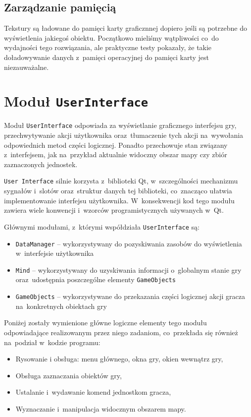 \documentclass[licencjacka]{pracamgr}
\begin{document}
    \subsection{Zarządzanie pamięcią}
      Tekstury są ładowane do pamięci karty graficznnej dopiero jeśli są potrzebne do wyświetlenia jakiegoś
      obiektu. Początkowo mieliśmy wątpliwości co~do wydajności tego rozwiązania, ale praktyczne testy pokazały, że
      takie doładowywanie danych z~pamięci operacyjnej do pamięci karty jest niezauważalne.

  \section{Moduł \texttt{UserInterface}}
    Moduł \texttt{UserInterface} odpowiada za wyświetlanie graficznego interfejsu gry, przechwytywanie akcji użytkownika
    oraz~tłumaczenie tych akcji na~wywołania odpowiednich metod części logicznej. Ponadto przechowuje stan związany
    z~interfejsem, jak na~przykład aktualnie widoczny obszar mapy czy zbiór zaznaczonych jednostek.

    \texttt{User Interface} silnie korzysta z~biblioteki Qt, w~szczególności mechanizmu sygnałów i~slotów oraz~struktur danych
    tej biblioteki, co~znacząco ułatwia implementowanie interfejsu użytkownika. W~konsekwencji kod tego modułu zawiera wiele
    konwencji i~wzorców programistycznych używanych w~Qt.

    Głównymi modułami, z~którymi współdziała \texttt{UserInterface} są:
    \begin{itemize}
     \item \texttt{DataManager} -- wykorzystywany do pozyskiwania zasobów do wyświetlenia w~interfejsie użytkownika
     \item \texttt{Mind} -- wykorzystywany do uzyskiwania informacji o~globalnym stanie gry oraz~udostępnia poszczególne elementy \texttt{GameObjects}
     \item \texttt{GameObjects} -- wykorzystywane do przekazania części logicznej akcji gracza na~konkretnych obiektach gry
    \end{itemize}

    Poniżej zostały wymienione główne logiczne elementy tego modułu odpowiadające realizowanym przez niego zadaniom,
    co~przekłada się również na~podział w~kodzie programu:

    \begin{itemize}
     \item Rysowanie i obsługa: menu głównego, okna gry, okien wewnątrz gry,
     \item Obsługa zaznaczania obiektów gry,
     \item Ustalanie i~wydawanie komend jednostkom gracza,
     \item Wyznaczanie i~manipulacja widocznym obszarem mapy.
    \end{itemize}
\end{document}
